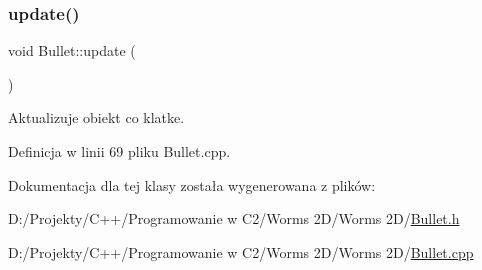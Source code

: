 \subsubsection{\texorpdfstring{update()}{update()}}
{\footnotesize\ttfamily void Bullet\+::update (\begin{DoxyParamCaption}{ }\end{DoxyParamCaption})}



Aktualizuje obiekt co klatke. 



Definicja w linii 69 pliku Bullet.\+cpp.



Dokumentacja dla tej klasy została wygenerowana z plików\+:\begin{DoxyCompactItemize}
\item 
D\+:/\+Projekty/\+C++/\+Programowanie w C2/\+Worms 2\+D/\+Worms 2\+D/\mbox{\hyperlink{_bullet_8h}{Bullet.\+h}}\item 
D\+:/\+Projekty/\+C++/\+Programowanie w C2/\+Worms 2\+D/\+Worms 2\+D/\mbox{\hyperlink{_bullet_8cpp}{Bullet.\+cpp}}\end{DoxyCompactItemize}
